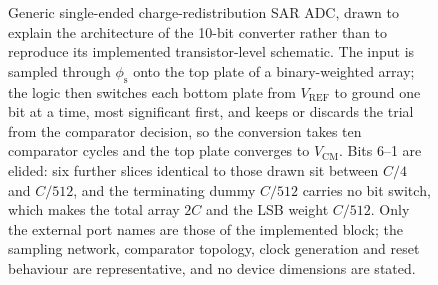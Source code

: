 \begin{figure}[htbp]
{\begin{circuitikz}
\end{circuitikz}
  }
  \caption[{Generic charge-redistribution SAR ADC architecture.}]{Generic single-ended charge-redistribution SAR ADC, drawn to explain the architecture of the 10-bit converter rather than to reproduce its implemented transistor-level schematic. The input is sampled through $\phi_{\mathrm{s}}$ onto the top plate of a binary-weighted array; the logic then switches each bottom plate from $V_{\mathrm{REF}}$ to ground one bit at a time, most significant first, and keeps or discards the trial from the comparator decision, so the conversion takes ten comparator cycles and the top plate converges to $V_{\mathrm{CM}}$. Bits 6--1 are elided: six further slices identical to those drawn sit between $C/4$ and $C/512$, and the terminating dummy $C/512$ carries no bit switch, which makes the total array $2C$ and the LSB weight $C/512$. Only the external port names are those of the implemented block; the sampling network, comparator topology, clock generation and reset behaviour are representative, and no device dimensions are stated.}
  \label{fig:adc-sar}
\end{figure}
